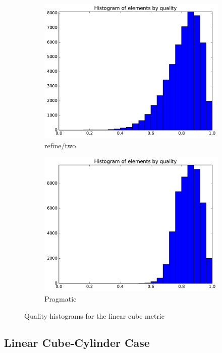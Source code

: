 \documentclass[3p,times,procedia,number]{elsarticle}
\begin{document}
\begin{figure}
\begin{subfigure}{.24\textwidth}
\includegraphics[width=\textwidth]{refine-two-cube-linear-quality.pdf}
\caption{refine/two}
\end{subfigure}
\begin{subfigure}{.24\textwidth}
\centering
\includegraphics[width=\textwidth]{pragmatic-cube-linear-quality.pdf}
\caption{Pragmatic}
\end{subfigure}
\caption{Quality histograms for the linear cube metric}
\label{fig:cube-linear-qualities}
\end{figure}

\subsection{Linear Cube-Cylinder Case}
\end{document}
